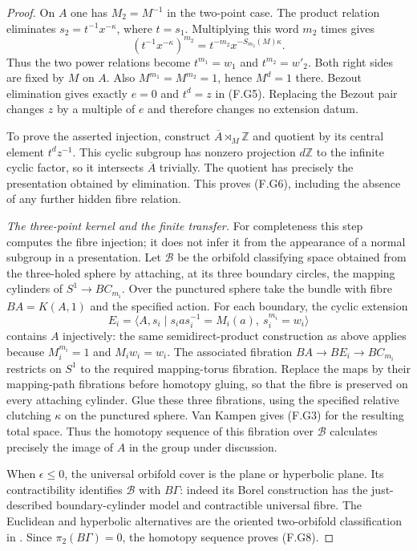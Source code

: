 \begin{proof}
On $A$ one has $M_2=M^{-1}$ in the two-point case.  The product
relation eliminates $s_2=t^{-1}x^{-\kappa}$, where $t=s_1$.
Multiplying this word $m_2$ times gives
\[
        (t^{-1}x^{-\kappa})^{m_2}
            =t^{-m_2}x^{-S_{m_2}(M)\kappa}.
\]
Thus the two power relations become $t^{m_1}=w_1$ and
$t^{m_2}=w'_2$.  Both right sides are fixed by $M$ on $A$.
Also $M^{m_1}=M^{m_2}=1$, hence $M^d=1$ there.
Bezout elimination gives exactly $e=0$ and $t^d=z$ in
(F.G5).  Replacing the Bezout pair changes $z$ by a multiple
of $e$ and therefore changes no extension datum.

To prove the asserted injection, construct
$\overline A\rtimes_M\mathbb Z$ and quotient by its central
element $t^dz^{-1}$.  This cyclic subgroup has nonzero
projection $d\mathbb Z$ to the infinite cyclic factor, so it
intersects $\overline A$ trivially.  The quotient has precisely
the presentation obtained by elimination.  This proves (F.G6),
including the absence of any further hidden fibre relation.

\emph{The three-point kernel and the finite transfer.}
For completeness this step computes the fibre injection; it
does not infer it from the appearance of a normal subgroup in
a presentation.  Let $\mathcal B$ be the orbifold classifying
space obtained from the three-holed sphere by attaching, at
its three boundary circles, the mapping cylinders of
$S^1\to BC_{m_i}$.  Over the punctured sphere take the bundle
with fibre $BA=K(A,1)$ and the specified action.  For each
boundary, the cyclic extension
\[
 E_i=\langle A,s_i\mid s_i a s_i^{-1}=M_i(a),\ s_i^{m_i}=w_i\rangle
\]
contains $A$ injectively: the same semidirect-product construction
as above applies because $M_i^{m_i}=1$ and $M_iw_i=w_i$.
The associated fibration $BA\to BE_i\to BC_{m_i}$ restricts
on $S^1$ to the required mapping-torus fibration.  Replace the
maps by their mapping-path fibrations before homotopy gluing,
so that the fibre is preserved on every attaching cylinder.
Glue these three fibrations, using the specified relative clutching
$\kappa$ on the punctured sphere.  Van Kampen gives (F.G3)
for the resulting total space.  Thus the homotopy sequence
of this fibration over $\mathcal B$ calculates precisely
the image of $A$ in the group under discussion.

When $\epsilon\le0$, the universal orbifold cover is the plane
or hyperbolic plane.  Its contractibility identifies
$\mathcal B$ with $B\Gamma$: indeed its Borel construction
has the just-described boundary-cylinder model and contractible
universal fibre.  The Euclidean and hyperbolic alternatives
are the oriented two-orbifold classification in
\cite[Theorems 2.3--2.4]{rootScott83}.
Since $\pi_2(B\Gamma)=0$, the homotopy sequence proves (F.G8).


\end{proof}
